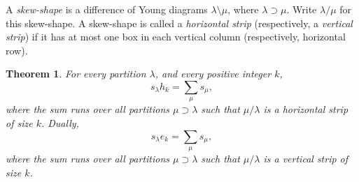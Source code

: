 \documentclass[11pt]{amsproc}
\newtheorem{theorem}{Theorem}[subsection]
\theoremstyle{definition}
\theoremstyle{example}
\begin{document}
A \emph{skew-shape} is a difference of Young diagrams $\lambda \setminus \mu$, where $\lambda \supset \mu$.
Write $\lambda/\mu$ for this skew-shape.
A skew-shape is called a \emph{horizontal strip} (respectively, a \emph{vertical strip}) if it has at most one box in each vertical column (respectively, horizontal row).
\begin{theorem}
  For every partition $\lambda$, and every positive integer $k$,
  \begin{displaymath}
    s_\lambda h_k = \sum_\mu s_\mu,
  \end{displaymath}
  where the sum runs over all partitions $\mu\supset\lambda$ such that $\mu/\lambda$ is a horizontal strip of size $k$.
  Dually,
  \begin{displaymath}
    s_\lambda e_k = \sum_\mu s_\mu,
  \end{displaymath}
  where the sum runs over all partitions $\mu\supset\lambda$ such that $\mu/\lambda$ is a vertical strip of size $k$.
\end{theorem}
\end{document}
